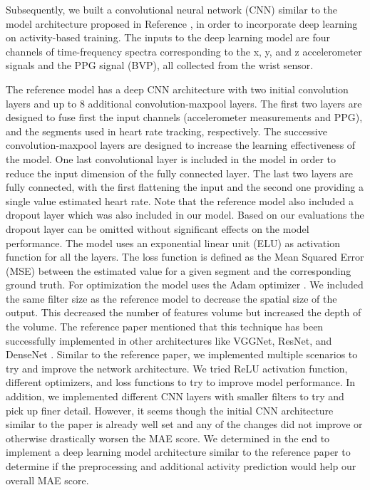 \documentclass[12pt, conference]{IEEEtran}
\begin{document}
Subsequently, we built a convolutional neural network (CNN) similar to the model architecture proposed in Reference \cite{reiss2019deep}, in order to incorporate deep learning on activity-based training. The inputs to the deep learning model are four channels of time-frequency spectra corresponding to the x, y, and z accelerometer signals and the PPG signal (BVP), all collected from the wrist sensor.

The reference model \cite{reiss2019deep} has a deep CNN architecture with two initial convolution layers and up to 8 additional convolution-maxpool layers. The first two layers are designed to fuse first the input channels (accelerometer measurements and PPG), and the segments used in heart rate tracking, respectively. The successive convolution-maxpool layers are designed to increase the learning effectiveness of the model. One last convolutional layer is included in the model in order to reduce the input dimension of the fully connected layer. The last two layers are fully connected, with the first flattening the input and the second one providing a single value estimated heart rate. Note that the reference model also included a dropout layer which was also included in our model. Based on our evaluations the dropout layer can be omitted without significant effects on the model performance. The model uses an exponential linear unit (ELU) as activation function for all the layers. The loss function is defined as the Mean Squared Error (MSE) between the estimated value for a given segment and the corresponding ground truth. For optimization the model uses the Adam optimizer \cite{kingma2014adam}. We included the same filter size as the reference model to decrease the spatial size of the output. This decreased the number of features volume but increased the depth of the volume. The reference paper mentioned that this technique has been successfully implemented in other architectures like VGGNet, ResNet, and DenseNet \cite{reiss2019deep}. 
Similar to the reference paper, we implemented multiple scenarios to try and improve the network architecture. We tried ReLU activation function, different optimizers, and loss functions to try to improve model performance. In addition, we implemented different CNN layers with smaller filters to try and pick up finer detail. However, it seems though the initial CNN architecture similar to the paper \cite{reiss2019deep} is already well set and any of the changes did not improve or otherwise drastically worsen the MAE score. We determined in the end to implement a deep learning model architecture similar to the reference paper to determine if the preprocessing and additional activity prediction would help our overall MAE score.  
\end{document}
